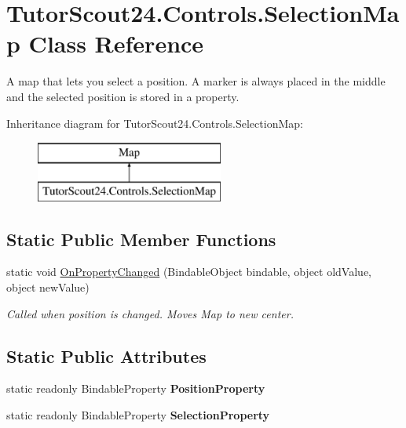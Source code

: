 \hypertarget{class_tutor_scout24_1_1_controls_1_1_selection_map}{}\section{Tutor\+Scout24.\+Controls.\+Selection\+Map Class Reference}
\label{class_tutor_scout24_1_1_controls_1_1_selection_map}


A map that lets you select a position. A marker is always placed in the middle and the selected position is stored in a property.  


Inheritance diagram for Tutor\+Scout24.\+Controls.\+Selection\+Map\+:\begin{figure}[H]
\begin{center}
\leavevmode
\includegraphics[height=2.000000cm]{class_tutor_scout24_1_1_controls_1_1_selection_map}
\end{center}
\end{figure}
\subsection*{Static Public Member Functions}
\begin{DoxyCompactItemize}
\item 
static void \mbox{\hyperlink{class_tutor_scout24_1_1_controls_1_1_selection_map_ab2558decc7d57c270b0fe0f5977be530}{On\+Property\+Changed}} (Bindable\+Object bindable, object old\+Value, object new\+Value)
\begin{DoxyCompactList}\small\item\em Called when position is changed. Moves Map to new center. \end{DoxyCompactList}\end{DoxyCompactItemize}
\subsection*{Static Public Attributes}
\begin{DoxyCompactItemize}
\item 
static readonly Bindable\+Property {\bfseries Position\+Property}
\item 
static readonly Bindable\+Property {\bfseries Selection\+Property}
\end{DoxyCompactItemize}

